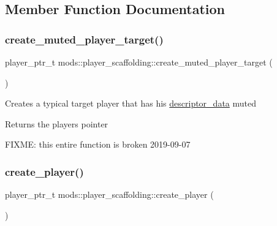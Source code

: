 \subsection{Member Function Documentation}
\mbox{\label{structmods_1_1player__scaffolding_a230c174a6d647b84fc8ed63e544fdab1}} 
\subsubsection{\texorpdfstring{create\+\_\+muted\+\_\+player\+\_\+target()}{create\_muted\_player\_target()}}
{\footnotesize\ttfamily player\+\_\+ptr\+\_\+t mods\+::player\+\_\+scaffolding\+::create\+\_\+muted\+\_\+player\+\_\+target (\begin{DoxyParamCaption}{ }\end{DoxyParamCaption})}

Creates a typical target player that has his \hyperlink{structmods_1_1descriptor__data}{descriptor\+\_\+data} muted \begin{DoxyReturn}{Returns}
the player\textquotesingle{}s pointer 
\end{DoxyReturn}
F\+I\+X\+ME\+: this entire function is broken 2019-\/09-\/07 \mbox{\label{structmods_1_1player__scaffolding_a668b8803bcad438e141ae1811fc08353}} 
\subsubsection{\texorpdfstring{create\+\_\+player()}{create\_player()}}
{\footnotesize\ttfamily player\+\_\+ptr\+\_\+t mods\+::player\+\_\+scaffolding\+::create\+\_\+player (\begin{DoxyParamCaption}{ }\end{DoxyParamCaption})}


